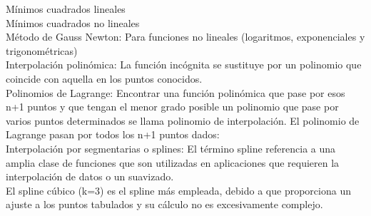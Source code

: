 M\'inimos cuadrados lineales\\
M\'inimos cuadrados no lineales\\
M\'etodo de Gauss Newton: Para funciones no lineales (logaritmos, exponenciales y trigonom\'etricas)\\

Interpolaci\'on polin\'omica: La funci\'on inc\'ognita se sustituye por un polinomio que coincide con aquella en los puntos conocidos.\\

Polinomios de Lagrange: Encontrar una funci\'on polin\'omica que pase por esos n+1 puntos y que tengan el menor grado posible un polinomio que pase por varios puntos determinados se llama polinomio de interpolaci\'on. El polinomio de Lagrange pasan por todos los n+1 puntos dados:\\

Interpolaci\'on por segmentarias o splines: El t\'ermino spline referencia a una amplia clase de funciones que son utilizadas en aplicaciones que requieren la interpolaci\'on de datos o un suavizado.\\ %
El spline c\'ubico (k=3) es el spline m\'as empleada, debido a que proporciona un ajuste a los puntos tabulados y su c\'alculo no es excesivamente complejo.\\